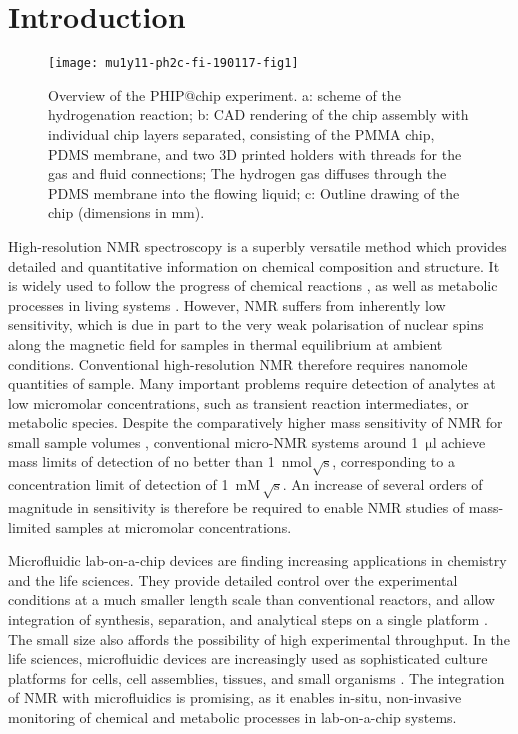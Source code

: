 \section{Introduction}

\begin{figure*}[t]
	\centering
	\texttt{[image: mu1y11-ph2c-fi-190117-fig1]}
	\caption{Overview of the PHIP@chip experiment.
		a: scheme of the hydrogenation reaction;
		b: CAD rendering of the chip assembly with individual chip layers
		separated, consisting of the PMMA chip, PDMS membrane, and two 3D
		printed holders with threads for the gas and fluid connections;
		The hydrogen gas
		diffuses through the PDMS membrane into the flowing liquid;
		c: Outline drawing of the chip (dimensions in mm).}
	\label{fig:phip@chip1}
\end{figure*}

High-resolution NMR
spectroscopy is a superbly versatile method which provides detailed and
quantitative information on chemical composition and structure. It is widely
used to follow the progress of chemical reactions
\cite{Foley-quantitative:2004bk,Foley:2014kpa},
as well as
metabolic processes in living systems
\cite{Wishart:2008ga,Gottschalk:2008ixa,CuperlovicCulf:2010vc,Shintu:2012bl}.
However, NMR suffers from inherently low sensitivity,
which is due in part to the very weak polarisation of nuclear spins along the magnetic
field for samples in thermal equilibrium at ambient conditions.
Conventional high-resolution NMR therefore requires nanomole quantities of
sample. Many important problems require detection of analytes at low
micromolar concentrations, such as transient reaction intermediates, or
metabolic species. Despite the
comparatively higher mass sensitivity of NMR for small sample volumes
\cite{Olson:1995vu,Bart:2009kc}, conventional micro-NMR systems  around
1~$\mathrm{\mu l}$ achieve mass limits of detection of no better than\cite{Finch:2016gv}
1~nmol$\sqrt{\mathrm{s}}$,  corresponding to a concentration
limit of detection of 1~$\mathrm{m M \, \sqrt{s}}$. An increase of several
orders of magnitude in sensitivity is therefore be required to enable NMR
studies of mass-limited samples at micromolar concentrations.

Microfluidic lab-on-a-chip devices are finding increasing applications in
chemistry and the
life sciences. They provide detailed control over the experimental
conditions at a much smaller length scale than conventional reactors, and
allow integration of synthesis, separation, and analytical steps on
a single platform \cite{Wang:2006en,Theberge:2012iq,Hoang:2011du,Ohno:2008da,Zhou:2004id,
Fang:2018ib,Hoang:2011ee,Gunther:2006vd}. The small size also affords the possibility of
high experimental throughput.
In the life sciences, microfluidic devices are increasingly used as
sophisticated culture platforms for cells,
cell assemblies, tissues, and small organisms
\cite{Manz:1990vc,Whitesides:2006vi,
ElAli:2006ci,West:2008jd,Neuzil:2012gc,Gracz:2015co}.
The integration of NMR with microfluidics
\cite{Ryan:2012ke,Badilita:2011td,Spengler:2014ir,Finch:2016gv} is promising, as
it enables in-situ, non-invasive monitoring of chemical and metabolic processes
in lab-on-a-chip systems.


